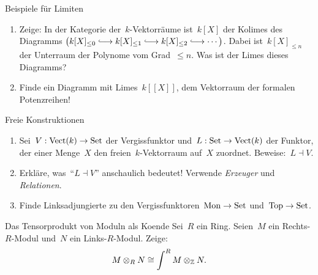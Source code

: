 \documentclass{uebblatt}
\begin{document}


\begin{aufgabe}{Beispiele für Limiten}
\begin{enumerate}
\item Zeige: In der Kategorie der~$k$-Vektorräume ist~$k[X]$ der Kolimes des
Diagramms $\bigl(k[X]_{\leq0} \lhra k[X]_{\leq1} \lhra k[X]_{\leq2} \lhra
\cdots \bigr)$. Dabei ist~$k[X]_{\leq n}$ der Unterraum der Polynome vom
Grad~$\leq n$. Was ist der Limes dieses Diagramms?
\item Finde ein Diagramm mit Limes~$k[[X]]$, dem Vektorraum
der formalen Potenzreihen!
\end{enumerate}
\end{aufgabe}

\begin{aufgabe}{Freie Konstruktionen}
\begin{enumerate}
\item Sei~$V : \mathrm{Vect}(k) \to \mathrm{Set}$ der Vergissfunktor und~$L : \mathrm{Set} \to
\mathrm{Vect}(k)$ der Funktor, der einer Menge~$X$ den freien~$k$-Vektorraum
auf~$X$ zuordnet. Beweise:~$L \dashv V$.
\item Erkläre, was~"`$L \dashv V$"' anschaulich bedeutet!
Verwende \emph{Erzeuger} und \emph{Relationen}.
\item Finde Linksadjungierte zu den Vergissfunktoren~$\mathrm{Mon} \to \mathrm{Set}$
und~$\mathrm{Top} \to \mathrm{Set}$.
\end{enumerate}
\end{aufgabe}

\begin{aufgabe}{Das Tensorprodukt von Moduln als Koende}
Sei~$R$ ein Ring. Seien~$M$ ein Rechts-$R$-Modul
und~$N$ ein Links-$R$-Modul. Zeige:
\[ M \otimes_R N \cong \int^R M \otimes_{\mathbb{Z}} N. \]
\vspace{-1.5em}
\end{aufgabe}
\end{document}
